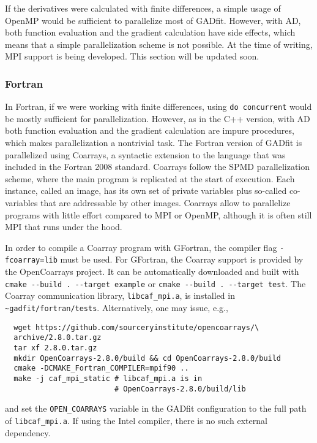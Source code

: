 \documentclass{article}
\begin{document}
If the derivatives were calculated with finite differences, a simple usage of OpenMP would be sufficient to parallelize most of GADfit. However, with AD, both function evaluation and the gradient calculation have side effects, which means that a simple parallelization scheme is not possible. At the time of writing, MPI support is being developed. This section will be updated soon.

\subsubsection{\label{sec:parallelism_fortran}Fortran}

In Fortran, if we were working with finite differences, using \texttt{do concurrent} would be mostly sufficient for parallelization. However, as in the C++ version, with AD both function evaluation and the gradient calculation are impure procedures, which makes parallelization a nontrivial task. The Fortran version of GADfit is parallelized using Coarrays, a syntactic extension to the language that was included in the Fortran 2008 standard. Coarrays follow the SPMD parallelization scheme, where the main program is replicated at the start of execution. Each instance, called an image, has its own set of private variables plus so-called co-variables that are addressable by other images. Coarrays allow to parallelize programs with little effort compared to MPI or OpenMP, although it is often still MPI that runs under the hood.

In order to compile a Coarray program with GFortran, the compiler flag \texttt{-fcoarray=lib} must be used. For GFortran, the Coarray support is provided by the OpenCoarrays project. It can be automatically downloaded and built with \verb+cmake --build . --target example+ or \verb+cmake --build . --target test+. The Coarray communication library, \verb+libcaf_mpi.a+, is installed in \\
\verb+~gadfit/fortran/tests+. Alternatively, one may issue, e.g.,
\begin{verbatim}
  wget https://github.com/sourceryinstitute/opencoarrays/\
  archive/2.8.0.tar.gz
  tar xf 2.8.0.tar.gz
  mkdir OpenCoarrays-2.8.0/build && cd OpenCoarrays-2.8.0/build
  cmake -DCMAKE_Fortran_COMPILER=mpif90 ..
  make -j caf_mpi_static # libcaf_mpi.a is in
                         # OpenCoarrays-2.8.0/build/lib
\end{verbatim}
and set the \verb+OPEN_COARRAYS+ variable in the GADfit configuration to the full path of \verb+libcaf_mpi.a+. If using the Intel compiler, there is no such external dependency.
\end{document}
